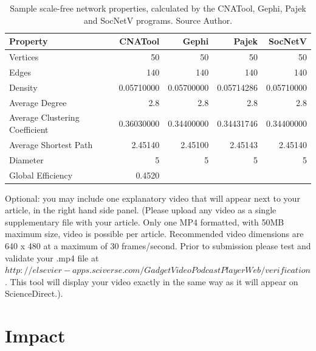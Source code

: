 \documentclass[preprint,12pt, a4paper]{elsarticle}
\begin{document}
\begin{table}[]
\centering
\begin{tabular}{|l|r|r|r|r|}
\hline
\textbf{Property}              & \textbf{CNATool} & \textbf{Gephi} & \textbf{Pajek} & \textbf{SocNetV} \\ \hline
Vertices                       & 50               & 50             & 50             & 50               \\ \hline
Edges                          & 140              & 140            & 140            & 140              \\ \hline
Density                        & 0.05710000       & 0.05700000     & 0.05714286     & 0.05710000       \\ \hline
Average Degree                 & 2.8              & 2.8            & 2.8            & 2.8              \\ \hline
Average Clustering Coefficient & 0.36030000       & 0.34400000     & 0.34431746     & 0.34400000       \\ \hline
Average Shortest Path          & 2.45140          & 2.45100        & 2.45143        & 2.45140          \\ \hline
Diameter                       & 5                & 5              & 5              & 5                \\ \hline
Global Efficiency              & 0.4520           &                &                &                  \\ \hline
\end{tabular}
\caption{Sample scale-free network properties, calculated by the CNATool, Gephi, Pajek and SocNetV programs. Source Author.}
\label{tab:properties}
\end{table}

Optional: you may include one explanatory video that will appear next to your article, in the right hand side panel. (Please upload any video as a single supplementary file with your article. Only one MP4 formatted, with 50MB maximum size, video is possible per article. Recommended video dimensions are 640 x 480 at a maximum of 30 frames/second. Prior to submission please test and validate your .mp4 file at $ http://elsevier-apps.sciverse.com/GadgetVideoPodcastPlayerWeb/verification$. This tool will display your video exactly in the same way as it will appear on ScienceDirect.).

\section{Impact}
\label{impact}
\end{document}
